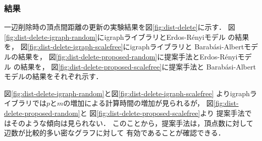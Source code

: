 \subsubsection*{結果}
一辺削除時の頂点間距離の更新の実験結果を図\ref{fig:dist-delete}に示す．
図\ref{fig:dist-delete-igraph-random}にigraphライブラリとErdos-R{\'e}nyiモデル
の結果を，
図\ref{fig:dist-delete-igraph-scalefree}にigraphライブラリと
Barab{\'a}si-Albertモデルの結果を，
図\ref{fig:dist-delete-proposed-random}に提案手法とErdos-R{\'e}nyiモデル
の結果を，
図\ref{fig:dist-delete-proposed-scalefree}に提案手法と
Barab{\'a}si-Albertモデルの結果をそれぞれ示す．

図\ref{fig:dist-delete-igraph-random}と図\ref{fig:dist-delete-igraph-scalefree}
よりigraphライブラリでは$p$と$m$の増加による計算時間の増加が見られるが，
図\ref{fig:dist-delete-proposed-random}と
図\ref{fig:dist-delete-proposed-scalefree}より
提案手法ではそのような傾向は見られない．
このことから，提案手法は，頂点数に対して辺数が比較的多い密なグラフに対して
有効であることが確認できる．

